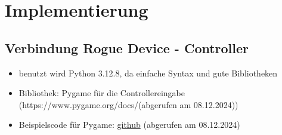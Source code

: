 \chapter{Implementierung}

\section{Verbindung Rogue Device - Controller}
\begin{itemize}
    \item benutzt wird Python 3.12.8, da einfache Syntax und gute Bibliotheken
    \item Bibliothek: Pygame für die Controllereingabe (https://www.pygame.org/docs/(abgerufen am 08.12.2024))
    \item Beispielscode für Pygame: \href{https://github.com/kevinmcaleer/xbox_controller}{github} (abgerufen am 08.12.2024)
\end{itemize}

